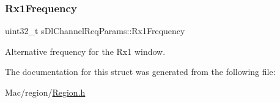 \subsubsection{\texorpdfstring{Rx1\+Frequency}{Rx1Frequency}}
{\footnotesize\ttfamily uint32\+\_\+t s\+Dl\+Channel\+Req\+Params\+::\+Rx1\+Frequency}

Alternative frequency for the Rx1 window. 

The documentation for this struct was generated from the following file\+:\begin{DoxyCompactItemize}
\item 
Mac/region/\hyperlink{Region_8h}{Region.\+h}\end{DoxyCompactItemize}
